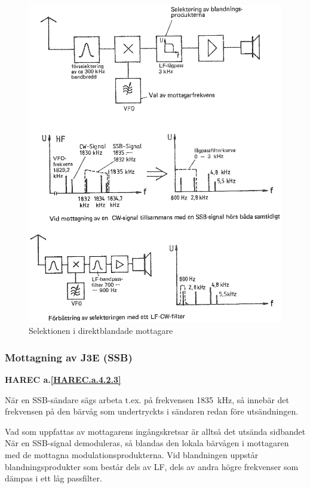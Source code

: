 \begin{figure}
  \includegraphics[width=\textwidth]{images/cropped_pdfs/bild_2_4-11.pdf}
  \caption{Selektionen i direktblandade mottagare}
  \label{fig:bildII4-11}
\end{figure}

\subsubsection{Mottagning av J3E (SSB)}
\textbf{HAREC a.\ref{HAREC.a.4.2.3}\label{myHAREC.a.4.2.3}}

När en SSB-sändare sägs arbeta t.ex. på frekvensen 1835~kHz, så
innebär det frekvensen på den bärvåg som undertryckts i sändaren redan
före utsändningen.

Vad som uppfattas av mottagarens ingångskretsar är alltså det utsända
sidbandet När en SSB-signal demoduleras, så blandas den lokala
bärvågen i mottagaren med de mottagna modulationsprodukterna.  Vid
blandningen uppstår blandningsprodukter som består dels av LF, dels av
andra högre frekvenser som dämpas i ett låg passfilter.

